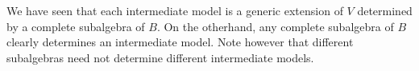 \begin{note}
We have seen that each intermediate model is a generic extension of $V$ determined by a complete subalgebra of $B$. On the otherhand, any
complete subalgebra of $B$ clearly determines an intermediate model. Note however that different subalgebras need not determine different intermediate models.
\end{note}



